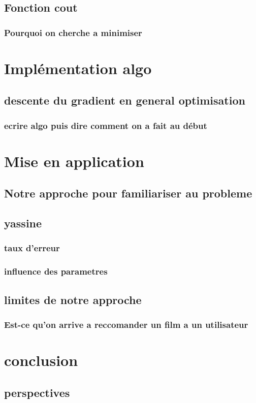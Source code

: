 \documentclass[a4paper,10pt]{article}
\begin{document}
\subsection{Fonction cout}
\subsubsection{Pourquoi on cherche a minimiser}
\section{Implémentation algo}
\subsection{descente du gradient en general optimisation}
\subsubsection{ecrire algo puis dire comment on a fait au début}
\section{Mise en application}
\subsection{Notre approche pour familiariser au probleme}
\subsection{yassine}
\subsubsection{taux d'erreur}
\subsubsection{influence des parametres}
\subsection{limites de notre approche}
\subsubsection{Est-ce qu'on arrive a reccomander un film a un utilisateur}
\section{conclusion}

\subsection{perspectives}
\end{document}
